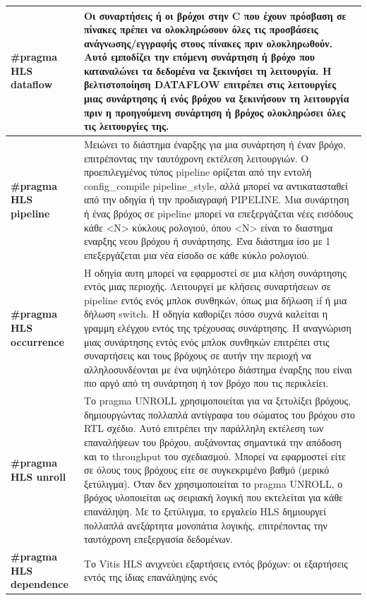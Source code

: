 \begin{longtable}{|p{4cm}|p{10cm}|}
  \hline
  \textbf{\#pragma HLS dataflow} & Οι συναρτήσεις ή οι βρόχοι στην C που έχουν πρόσβαση σε πίνακες πρέπει να ολοκληρώσουν όλες τις προσβάσεις ανάγνωσης/εγγραφής
  στους πίνακες πριν ολοκληρωθούν. Αυτό εμποδίζει την επόμενη συνάρτηση ή βρόχο που καταναλώνει τα δεδομένα να ξεκινήσει τη λειτουργία.
  Η βελτιστοποίηση DATAFLOW επιτρέπει στις λειτουργίες μιας συνάρτησης ή ενός βρόχου να ξεκινήσουν τη λειτουργία πριν η προηγούμενη συνάρτηση ή βρόχος ολοκληρώσει όλες τις λειτουργίες της.\\
  \hline
  \textbf{\#pragma HLS pipeline} & Μειώνει το διάστημα έναρξης για μια συνάρτηση ή έναν βρόχο, επιτρέποντας την ταυτόχρονη εκτέλεση λειτουργιών.
  Ο προεπιλεγμένος τύπος pipeline ορίζεται από την εντολή config\_compile pipeline\_style, αλλά μπορεί να αντικατασταθεί από την οδηγία ή την προδιαγραφή PIPELINE.
  Μια συνάρτηση ή ένας βρόχος σε pipeline μπορεί να επεξεργάζεται νέες εισόδους κάθε <N> κύκλους ρολογιού, όπου <N> είναι το διαστημα εναρξης νεου βρόχου ή συνάρτησης.
  Ένα διάστημα ίσο με 1 επεξεργάζεται μια νέα είσοδο σε κάθε κύκλο ρολογιού.\\
  \hline
  \textbf{\#pragma HLS occurrence} & Η οδηγία αυτη μπορεί να εφαρμοστεί σε μια κλήση συνάρτησης εντός μιας περιοχής.
  Λειτουργεί με κλήσεις συναρτήσεων σε pipeline εντός ενός μπλοκ συνθηκών, όπως μια δήλωση if ή μια δήλωση switch.
  Η οδηγία καθορίζει πόσο συχνά καλείται η γραμμη ελέγχου εντός της τρέχουσας συνάρτησης. Η αναγνώριση μιας συνάρτησης εντός ενός μπλοκ συνθηκών
  επιτρέπει στις συναρτήσεις και τους βρόχους σε αυτήν την περιοχή να αλληλοσυνδέονται με ένα υψηλότερο διάστημα έναρξης που είναι πιο αργό από τη συνάρτηση ή τον βρόχο που τις περικλείει.\\
  \hline
  \textbf{\#pragma HLS unroll} & Το pragma UNROLL χρησιμοποιείται για να ξετυλίξει βρόχους, δημιουργώντας πολλαπλά αντίγραφα του σώματος του βρόχου στο RTL σχέδιο.
  Αυτό επιτρέπει την παράλληλη εκτέλεση των επαναλήψεων του βρόχου, αυξάνοντας σημαντικά την απόδοση και το throughput του σχεδιασμού.
  Μπορεί να εφαρμοστεί είτε σε όλους τους βρόχους είτε σε συγκεκριμένο βαθμό (μερικό ξετύλιγμα).
  Όταν δεν χρησιμοποιείται το pragma UNROLL, ο βρόχος υλοποιείται ως σειριακή λογική που εκτελείται για κάθε επανάληψη.
  Με το ξετύλιγμα, το εργαλείο HLS δημιουργεί πολλαπλά ανεξάρτητα μονοπάτια λογικής, επιτρέποντας την ταυτόχρονη επεξεργασία δεδομένων. \\
  \hline
  \textbf{\#pragma HLS dependence} & Το Vitis HLS ανιχνεύει εξαρτήσεις εντός βρόχων: οι εξαρτήσεις εντός της ίδιας επανάληψης ενός

\end{longtable}
